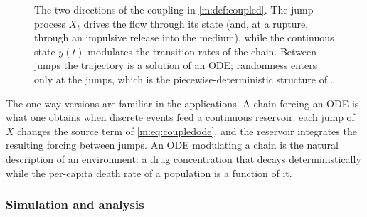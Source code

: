 \begin{figure}[ht]
\centering
{}
\caption{The two directions of the coupling in \cref{m:def:coupled}. The jump
process $X_t$ drives the flow through its state (and, at a rupture, through an
impulsive release into the medium), while the continuous state $y(t)$ modulates
the transition rates of the chain. Between jumps the trajectory is a solution of
an ODE; randomness enters only at the jumps, which is the
piecewise-deterministic structure of \cite{Davis1993}.}
\label{m:fig:coupled}
\end{figure}

The one-way versions are familiar in the applications. A chain forcing an ODE
is what one obtains when discrete events feed a continuous reservoir: each jump
of $X$ changes the source term of \cref{m:eq:coupledode}, and the reservoir
integrates the resulting forcing between jumps. An ODE modulating a chain is the
natural description of an environment: a drug concentration that decays
deterministically while the per-capita death rate of a population is a function
of it.

\subsubsection{Simulation and analysis}
\label{m:sec:coupledsim}

